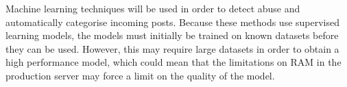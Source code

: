 Machine learning techniques will be used in order to detect abuse and automatically categorise incoming posts. Because these methods use supervised learning models, the models must initially be trained on known datasets before they can be used. However, this may require large datasets in order to obtain a high performance model, which could mean that the limitations on RAM in the production server may force a limit on the quality of the model.
